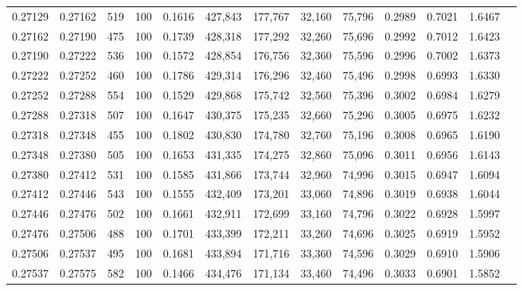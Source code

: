 \begin{tabular}{rrrrrrrrrrrrr}
0.27129 & 0.27162 &   519 & 100 &                                     0.1616 & 427,843 & 177,767 &  32,160 &  75,796 & 0.2989 & 0.7021 & 1.6467 \\
0.27162 & 0.27190 &   475 & 100 &                                     0.1739 & 428,318 & 177,292 &  32,260 &  75,696 & 0.2992 & 0.7012 & 1.6423 \\
0.27190 & 0.27222 &   536 & 100 &                                     0.1572 & 428,854 & 176,756 &  32,360 &  75,596 & 0.2996 & 0.7002 & 1.6373 \\
0.27222 & 0.27252 &   460 & 100 &                                     0.1786 & 429,314 & 176,296 &  32,460 &  75,496 & 0.2998 & 0.6993 & 1.6330 \\
0.27252 & 0.27288 &   554 & 100 &                                     0.1529 & 429,868 & 175,742 &  32,560 &  75,396 & 0.3002 & 0.6984 & 1.6279 \\
0.27288 & 0.27318 &   507 & 100 &                                     0.1647 & 430,375 & 175,235 &  32,660 &  75,296 & 0.3005 & 0.6975 & 1.6232 \\
0.27318 & 0.27348 &   455 & 100 &                                     0.1802 & 430,830 & 174,780 &  32,760 &  75,196 & 0.3008 & 0.6965 & 1.6190 \\
0.27348 & 0.27380 &   505 & 100 &                                     0.1653 & 431,335 & 174,275 &  32,860 &  75,096 & 0.3011 & 0.6956 & 1.6143 \\
0.27380 & 0.27412 &   531 & 100 &                                     0.1585 & 431,866 & 173,744 &  32,960 &  74,996 & 0.3015 & 0.6947 & 1.6094 \\
0.27412 & 0.27446 &   543 & 100 &                                     0.1555 & 432,409 & 173,201 &  33,060 &  74,896 & 0.3019 & 0.6938 & 1.6044 \\
0.27446 & 0.27476 &   502 & 100 &                                     0.1661 & 432,911 & 172,699 &  33,160 &  74,796 & 0.3022 & 0.6928 & 1.5997 \\
0.27476 & 0.27506 &   488 & 100 &                                     0.1701 & 433,399 & 172,211 &  33,260 &  74,696 & 0.3025 & 0.6919 & 1.5952 \\
0.27506 & 0.27537 &   495 & 100 &                                     0.1681 & 433,894 & 171,716 &  33,360 &  74,596 & 0.3029 & 0.6910 & 1.5906 \\
0.27537 & 0.27575 &   582 & 100 &                                     0.1466 & 434,476 & 171,134 &  33,460 &  74,496 & 0.3033 & 0.6901 & 1.5852 \\

\end{tabular}
